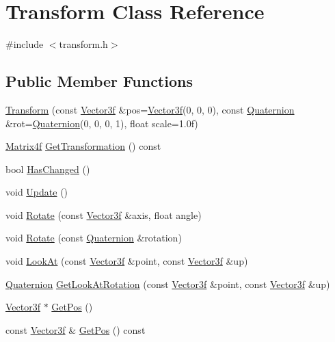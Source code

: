 \hypertarget{class_transform}{}\section{Transform Class Reference}
\label{class_transform}


{\ttfamily \#include $<$transform.\+h$>$}

\subsection*{Public Member Functions}
\begin{DoxyCompactItemize}
\item 
\hyperlink{class_transform_a5a7c897577867bcc5be0b0f5da5a325a}{Transform} (const \hyperlink{class_vector3f}{Vector3f} \&pos=\hyperlink{class_vector3f}{Vector3f}(0, 0, 0), const \hyperlink{class_quaternion}{Quaternion} \&rot=\hyperlink{class_quaternion}{Quaternion}(0, 0, 0, 1), float scale=1.\+0f)
\item 
\hyperlink{math3d_8h_a5b7721ab7216c91a40538beaa9e6ee1f}{Matrix4f} \hyperlink{class_transform_a11dec5b652271a3c4aebdcbc40d318c3}{Get\+Transformation} () const 
\item 
bool \hyperlink{class_transform_a2be4a2c35324d180640d3943b1aecbdd}{Has\+Changed} ()
\item 
void \hyperlink{class_transform_a3256c0fb53d0b341ad8d80fe61e5fb2d}{Update} ()
\item 
void \hyperlink{class_transform_a98a622bae4565181d7648600d9a074fc}{Rotate} (const \hyperlink{class_vector3f}{Vector3f} \&axis, float angle)
\item 
void \hyperlink{class_transform_aa44afbfad3eb5ad0506cea367ea94979}{Rotate} (const \hyperlink{class_quaternion}{Quaternion} \&rotation)
\item 
void \hyperlink{class_transform_a70a53ea2fa7600c37ab1e4929a43a193}{Look\+At} (const \hyperlink{class_vector3f}{Vector3f} \&point, const \hyperlink{class_vector3f}{Vector3f} \&up)
\item 
\hyperlink{class_quaternion}{Quaternion} \hyperlink{class_transform_a84966de18bf8e531ad377b4442f87911}{Get\+Look\+At\+Rotation} (const \hyperlink{class_vector3f}{Vector3f} \&point, const \hyperlink{class_vector3f}{Vector3f} \&up)
\item 
\hyperlink{class_vector3f}{Vector3f} $\ast$ \hyperlink{class_transform_aa4f0b5bba58b14b7357fdb975234ebaa}{Get\+Pos} ()
\item 
const \hyperlink{class_vector3f}{Vector3f} \& \hyperlink{class_transform_a6bced070570282ee5143ac7faa8c694b}{Get\+Pos} () const 

\end{DoxyCompactItemize}
